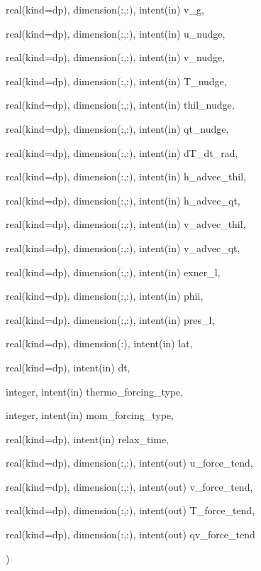 {\begin{DoxyParamCaption}
\item[{real(kind=dp), dimension(\+:,\+:), intent(in)}]{v\+\_\+g, }
\item[{real(kind=dp), dimension(\+:,\+:), intent(in)}]{u\+\_\+nudge, }
\item[{real(kind=dp), dimension(\+:,\+:), intent(in)}]{v\+\_\+nudge, }
\item[{real(kind=dp), dimension(\+:,\+:), intent(in)}]{T\+\_\+nudge, }
\item[{real(kind=dp), dimension(\+:,\+:), intent(in)}]{thil\+\_\+nudge, }
\item[{real(kind=dp), dimension(\+:,\+:), intent(in)}]{qt\+\_\+nudge, }
\item[{real(kind=dp), dimension(\+:,\+:), intent(in)}]{d\+T\+\_\+dt\+\_\+rad, }
\item[{real(kind=dp), dimension(\+:,\+:), intent(in)}]{h\+\_\+advec\+\_\+thil, }
\item[{real(kind=dp), dimension(\+:,\+:), intent(in)}]{h\+\_\+advec\+\_\+qt, }
\item[{real(kind=dp), dimension(\+:,\+:), intent(in)}]{v\+\_\+advec\+\_\+thil, }
\item[{real(kind=dp), dimension(\+:,\+:), intent(in)}]{v\+\_\+advec\+\_\+qt, }
\item[{real(kind=dp), dimension(\+:,\+:), intent(in)}]{exner\+\_\+l, }
\item[{real(kind=dp), dimension(\+:,\+:), intent(in)}]{phii, }
\item[{real(kind=dp), dimension(\+:,\+:), intent(in)}]{pres\+\_\+l, }
\item[{real(kind=dp), dimension(\+:), intent(in)}]{lat, }
\item[{real(kind=dp), intent(in)}]{dt, }
\item[{integer, intent(in)}]{thermo\+\_\+forcing\+\_\+type, }
\item[{integer, intent(in)}]{mom\+\_\+forcing\+\_\+type, }
\item[{real(kind=dp), intent(in)}]{relax\+\_\+time, }
\item[{real(kind=dp), dimension(\+:,\+:), intent(out)}]{u\+\_\+force\+\_\+tend, }
\item[{real(kind=dp), dimension(\+:,\+:), intent(out)}]{v\+\_\+force\+\_\+tend, }
\item[{real(kind=dp), dimension(\+:,\+:), intent(out)}]{T\+\_\+force\+\_\+tend, }
\item[{real(kind=dp), dimension(\+:,\+:), intent(out)}]{qv\+\_\+force\+\_\+tend}
\end{DoxyParamCaption}
)}\hypertarget{group__forcing_gaa9a429a52d986be1bc2458f56e8f77aa}{}\label{group__forcing_gaa9a429a52d986be1bc2458f56e8f77aa}


